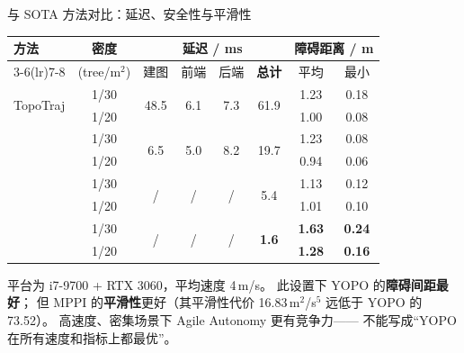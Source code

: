 \begin{frame}{与 SOTA 方法对比：延迟、安全性与平滑性}
  \small
  \begin{center}\scriptsize
  \begin{tabular}{@{}lccccccc@{}}
    \toprule
    \multirow{2}{*}{方法} & 密度 & \multicolumn{4}{c}{延迟 / ms} &
    \multicolumn{2}{c}{障碍距离 / m} \\
    \cmidrule(lr){3-6}\cmidrule(lr){7-8}
     & (tree/m$^2$) & 建图 & 前端 & 后端 & \textbf{总计} & 平均 & 最小 \\
    \midrule
    \multirow{2}{*}{TopoTraj} & 1/30 & \multirow{2}{*}{48.5} & \multirow{2}{*}{6.1} & \multirow{2}{*}{7.3} & \multirow{2}{*}{61.9} & 1.23 & 0.18 \\
                              & 1/20 & & & & & 1.00 & 0.08 \\
    \addlinespace
    \multirow{2}{*}{MPPI} & 1/30 & \multirow{2}{*}{6.5} & \multirow{2}{*}{5.0} & \multirow{2}{*}{8.2} & \multirow{2}{*}{19.7} & 1.23 & 0.08 \\
                          & 1/20 & & & & & 0.94 & 0.06 \\
    \addlinespace
    \multirow{2}{*}{Agile Autonomy} & 1/30 & \multirow{2}{*}{/} & \multirow{2}{*}{/} & \multirow{2}{*}{/} & \multirow{2}{*}{5.4} & 1.13 & 0.12 \\
                                   & 1/20 & & & & & 1.01 & 0.10 \\
    \addlinespace
    \multirow{2}{*}{\textbf{YOPO}} & 1/30 & \multirow{2}{*}{/} & \multirow{2}{*}{/} & \multirow{2}{*}{/} & \multirow{2}{*}{\textbf{1.6}} & \textbf{1.63} & \textbf{0.24} \\
                                   & 1/20 & & & & & \textbf{1.28} & \textbf{0.16} \\
    \bottomrule
  \end{tabular}
  \end{center}
  \vspace{0.1em}
  \begin{reading}
    \footnotesize
    平台为 i7-9700 + RTX 3060，平均速度 4\,m/s。
    此设置下 YOPO 的\textbf{障碍间距最好}；
    但 MPPI 的\textbf{平滑性}更好（其平滑性代价 16.83\,m$^2$/s$^5$ 远低于 YOPO 的 73.52）。
    高速度、密集场景下 Agile Autonomy 更有竞争力——
    不能写成“YOPO 在所有速度和指标上都最优”。
  \end{reading}
\end{frame}

